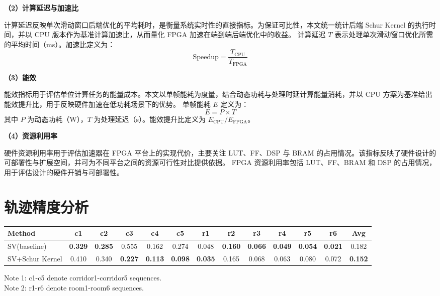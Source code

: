 \textbf{（2）计算延迟与加速比}

计算延迟反映单次滑动窗口后端优化的平均耗时，是衡量系统实时性的直接指标。为保证可比性，本文统一统计后端 Schur Kernel 的执行时间，并以 CPU 版本作为基准计算加速比，从而量化 FPGA 加速在端到端后端优化中的收益。
计算延迟 $T$ 表示处理单次滑动窗口优化所需的平均时间（ms）。加速比定义为：
\begin{equation}
\text{Speedup} = \frac{T_{\text{CPU}}}{T_{\text{FPGA}}}
\label{eq:speedup}
\end{equation}

\textbf{（3）能效}

能效指标用于评估单位计算任务的能量成本。本文以单帧能耗为度量，结合动态功耗与处理时延计算能量消耗，并以 CPU 方案为基准给出能效提升比，用于反映硬件加速在低功耗场景下的优势。
单帧能耗 $E$ 定义为：
\begin{equation}
E = P \times T
\label{eq:energy}
\end{equation}
其中 $P$ 为动态功耗（W），$T$ 为处理延迟（s）。能效提升比定义为 $E_{\text{CPU}} / E_{\text{FPGA}}$。

\textbf{（4）资源利用率}

硬件资源利用率用于评估加速器在 FPGA 平台上的实现代价，主要关注 LUT、FF、DSP 与 BRAM 的占用情况。该指标反映了硬件设计的可部署性与扩展空间，并可为不同平台之间的资源可行性对比提供依据。
FPGA 资源利用率包括 LUT、FF、BRAM 和 DSP 的占用情况，用于评估设计的硬件开销与可部署性。

\section{轨迹精度分析}

\begin{table}[htbp]
  \centering
  \label{tab:ate_tumvi}
  \scriptsize
  \begin{tabular}{lcccccccccccc}
    \hline
    Method              & c1 & c2 & c3 & c4 & c5 & r1 & r2 & r3 & r4 & r5 & r6  & Avg \\
    \hline
    SV(baseline)        & \textbf{0.329} & \textbf{0.285} & 0.555 & 0.162 & 0.274 & 0.048 & \textbf{0.160} & \textbf{0.066} & \textbf{0.049} & \textbf{0.054} & \textbf{0.021} & 0.182 \\
    SV+Schur Kernel   & 0.410 & 0.340 & \textbf{0.227} & \textbf{0.113} & \textbf{0.098} & \textbf{0.035} & 0.165 & 0.068 & 0.063 & 0.080 & 0.072 & \textbf{0.152} \\
    \hline
  \end{tabular}
  \begin{flushleft}
  \footnotesize
  Note 1: c1-c5 denote corridor1-corridor5 sequences. \\
  Note 2: r1-r6 denote room1-room6 sequences.
  \end{flushleft}
\end{table}

